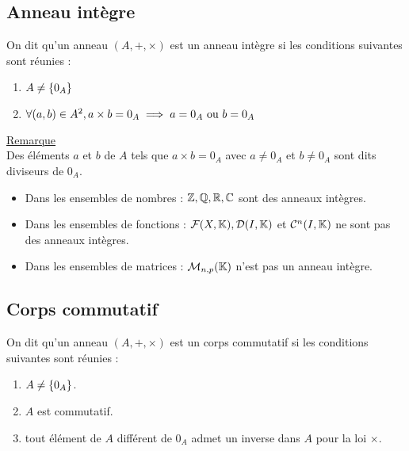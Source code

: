 \subsection{Anneau intègre}

\begin{defi}
    On dit qu’un anneau \((A, +, \times)\) est un anneau intègre si les conditions suivantes sont réunies :
    \begin{enumerate}
        \item \(A\neq \left\lbrace0_A\right\rbrace\)
        \item \(\forall (a, b) \in A^2, a \times b = 0_A \implies a = 0_A\text{ ou }b = 0_A\)
    \end{enumerate}
    \underline{Remarque}\\
    Des éléments \(a\) et \(b\) de \(A\) tels que \(a \times b = 0_A\) avec \(a\neq 0_A\) et \(b\neq 0_A\) sont dits diviseurs de \(0_A\).
\end{defi}

\begin{defprop}
    \begin{itemize}
        \item Dans les ensembles de nombres : \(\mathbb{Z}, \mathbb{Q}, \mathbb{R}, \mathbb{C}\) sont des anneaux intègres.
        \item Dans les ensembles de fonctions : \(\mathcal{F}(X, \mathbb{K}), \mathcal{D} (I, \mathbb{K})\) et \(\mathcal{C}^n (I, \mathbb{K})\) ne sont pas des anneaux intègres.
        \item Dans les ensembles de matrices : \(\mathcal{M}_{n,p} (\mathbb{K})\) n’est pas un anneau intègre.
    \end{itemize}
\end{defprop}

\subsection{Corps commutatif}
\begin{defi}
    On dit qu’un anneau \((A, +, \times)\) est un corps commutatif si les conditions suivantes sont réunies :
    \begin{enumerate}
        \item \(A\neq \left\lbrace0_A\right\rbrace\).
        \item \(A\) est commutatif.
        \item tout élément de \(A\) différent de \(0_A\) admet un inverse dans \(A\) pour la loi \(\times\).
    \end{enumerate}
\end{defi}

